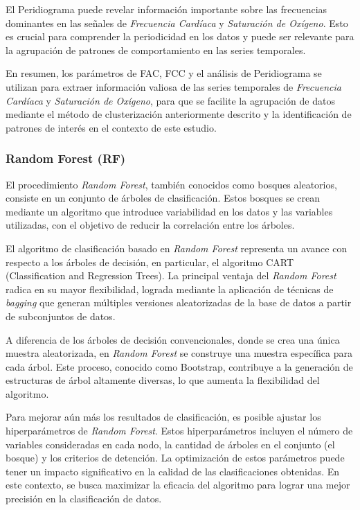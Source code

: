 El Peridiograma puede revelar información importante sobre las frecuencias dominantes en las señales de \textit{Frecuencia Cardíaca} y \textit{Saturación de Oxígeno}. Esto es crucial para comprender la periodicidad en los datos y puede ser relevante para la agrupación de patrones de comportamiento en las series temporales.

En resumen, los parámetros de FAC, FCC y el análisis de Peridiograma se utilizan para extraer información valiosa de las series temporales de \textit{Frecuencia Cardíaca} y \textit{Saturación de Oxígeno}, para que se facilite la agrupación de datos mediante el método de clusterización anteriormente descrito y la identificación de patrones de interés en el contexto de este estudio.


\subsubsection{Random Forest (RF)}\label{sec:rf}

El procedimiento \textit{Random Forest}, también conocidos como bosques aleatorios, consiste en un conjunto de árboles de clasificación. Estos bosques se crean mediante un algoritmo que introduce variabilidad en los datos y las variables utilizadas, con el objetivo de reducir la correlación entre los árboles.

El algoritmo de clasificación basado en \textit{Random Forest} representa un avance con respecto a los árboles de decisión, en particular, el algoritmo CART (Classification and Regression Trees). La principal ventaja del \textit{Random Forest} radica en su mayor flexibilidad, lograda mediante la aplicación de técnicas de \textit{bagging} que generan múltiples versiones aleatorizadas de la base de datos a partir de subconjuntos de datos.

A diferencia de los árboles de decisión convencionales, donde se crea una única muestra aleatorizada, en \textit{Random Forest} se construye una muestra específica para cada árbol. Este proceso, conocido como Bootstrap, contribuye a la generación de estructuras de árbol altamente diversas, lo que aumenta la flexibilidad del algoritmo.

Para mejorar aún más los resultados de clasificación, es posible ajustar los hiperparámetros de \textit{Random Forest}. Estos hiperparámetros incluyen el número de variables consideradas en cada nodo, la cantidad de árboles en el conjunto (el bosque) y los criterios de detención. La optimización de estos parámetros puede tener un impacto significativo en la calidad de las clasificaciones obtenidas. En este contexto, se busca maximizar la eficacia del algoritmo para lograr una mejor precisión en la clasificación de datos.

